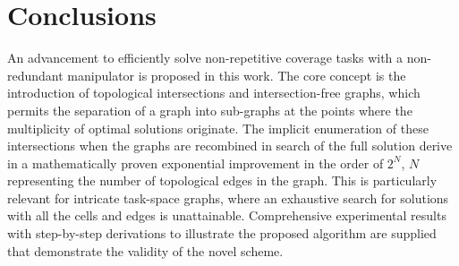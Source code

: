 \documentclass[conference]{IEEEtran}
\begin{document}
\section{Conclusions}
An advancement to efficiently solve non-repetitive coverage tasks with a non-redundant manipulator is proposed in this work. 
The core concept is the introduction of topological intersections and intersection-free graphs, which permits the separation of a graph 
into sub-graphs at the points where the multiplicity of optimal solutions originate. 
The implicit enumeration of these intersections when the graphs are recombined in search of the full solution derive in a mathematically proven exponential improvement in the order of $2^N$, $N$ representing the number of topological edges in the graph. This is particularly relevant for intricate task-space graphs,
where an exhaustive search for solutions with all the cells and edges is unattainable. 
Comprehensive experimental results with step-by-step derivations to illustrate the proposed algorithm are supplied that demonstrate the validity of the novel scheme. 
\label{section_conclusion}






\end{document}

